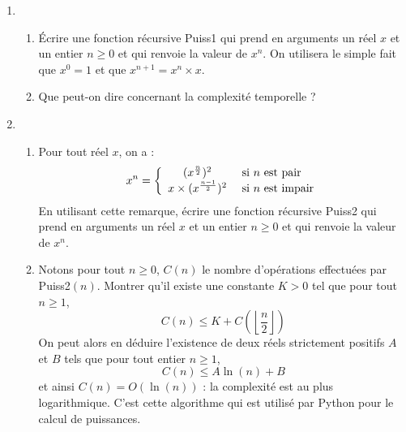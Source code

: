 \documentclass[french,11pt,twoside]{VcCours}
\begin{document}
\begin{enumerate}
\item 
\begin{enumerate}
\item Écrire une fonction récursive Puiss1 qui prend en arguments un réel $x$ et un entier $n \geq 0$ et qui renvoie la valeur de $x^n$. On utilisera le simple fait que $x^0=1$ et que $x^{n+1}=x^n \times x$.
\item Que peut-on dire concernant la complexité temporelle ?
\end{enumerate}
\item 
\begin{enumerate}
\item Pour tout réel $x$, on a :
$$x^n = \left\lbrace \begin{array}{cll}
(x^{\frac{n}{2}})^2 & \hbox{ si } n \hbox{ est pair} \\
x \times (x^{\frac{n-1}{2}})^2  & \hbox{ si } n \hbox{ est impair} \\
\end{array}\right.$$
En utilisant cette remarque, écrire une fonction récursive Puiss2 qui prend en arguments un réel $x$ et un entier $n \geq 0$ et qui renvoie la valeur de $x^n$.
\item Notons pour tout $n \geq 0$, $C(n)$ le nombre d'opérations effectuées par Puiss2$(n)$. Montrer qu'il existe une constante $K>0$ tel que pour tout $n \geq 1$,
$$ C(n) \leq K + C \left( \left\lfloor\frac{n}{2} \right\rfloor\right)$$
On peut alors en déduire l'existence de deux réels strictement positifs $A$ et $B$ tels que pour tout entier $n \geq 1$,
$$ C(n) \leq A \ln(n) +B$$
et ainsi $C(n)=O(\ln(n))$ : la complexité est au plus logarithmique. C'est cette algorithme qui est utilisé par Python pour le calcul de puissances.
\end{enumerate}
\end{enumerate}
\end{document}
